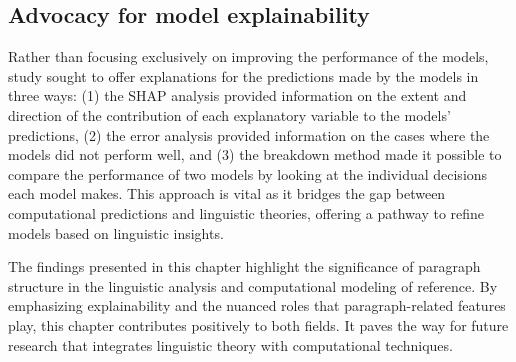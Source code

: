 \subsection{Advocacy for model explainability} 
Rather than focusing exclusively on improving the performance of the models, study \studE sought to offer explanations for the predictions made by the models in three ways: (1) the SHAP analysis provided information on the extent and direction of the contribution of each explanatory variable to the models' predictions, (2) the error analysis provided information on the cases where the models did not perform well, and (3) the breakdown method made it possible to compare the performance of two models by looking at the individual decisions each model makes. This approach is vital as it bridges the gap between computational predictions and linguistic theories, offering a pathway to refine models based on linguistic insights. 

The findings presented in this chapter highlight the significance of paragraph structure in the linguistic analysis and computational modeling of reference. By emphasizing explainability and the nuanced roles that paragraph-related features play, this chapter contributes positively to both fields. It paves the way for future research that integrates linguistic theory with computational techniques.
